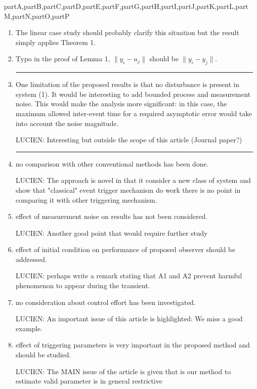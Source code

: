 \documentclass[letterpaper, 10 pt, conference]{ieeeconf}
\def\compile{partA,partB,partC,partD,partE,partF,partG,partH,partI,partJ,partK,partL,partM,partN,partO,partP}
\begin{document}
\begin{xcomment}{\compile}
\begin{partQ}
\begin{enumerate}
\item The linear case study should probably clarify this situation but the result simply applies Theorem 1.



\item Typo in the proof of Lemma 1, $\| y_i - u_j\|$ should be $\|y_i - y_j\|$.

\medskip\hrule\medskip

\item One limitation of the proposed results is that no disturbance is present in system (1). It would be interesting to add bounded process and measurement noise.
This would make the analysis more significant: in this case, the maximum allowed inter-event time for a required asymptotic error would take into account the noise magnitude.

LUCIEN: Interesting but outside the scope of this article (Journal paper?)


\medskip\hrule\medskip

\item no comparison with other conventional methods has been done.

LUCIEN: The approach is novel in that it consider a new class of system and show that "classical" event trigger mechanism do work there is no point in comparing it with other triggering mechanism.

\item effect of measurement noise on results has not been considered.

LUCIEN: Another good point that would require further study

\item effect of initial condition on performance of proposed observer should be addressed.

LUCIEN: perhaps write a remark stating that A1 and A2 prevent harmful phenomenon to appear during the transient.

\item no consideration about control effort has been investigated.

LUCIEN: An important issue of this article is highlighted: We miss a good example.

\item effect of triggering parameters is very important in the proposed method and should be studied.

LUCIEN: The MAIN issue of the article is given that is our method to estimate valid parameter is in general restrictive 


\end{enumerate}



\end{partQ}


\end{xcomment}
                                                                
\end{document}
